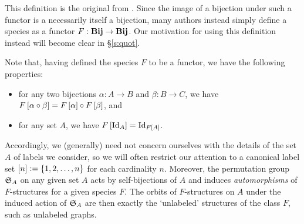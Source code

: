 \documentclass[sectionflow,singlespace,twoside,boldmathhdr,draft]{brandiss} %
\numberwithin{section}{chapter}
\numberwithin{figure}{chapter}
\begin{document}
This definition is the original from \cite{joy:species}.
Since the image of a bijection under such a functor is a necessarily itself a bijection, many authors instead simply define a species as a functor $F: \mathbf{Bij} \to \mathbf{Bij}$.
Our motivation for using this definition instead will become clear in \S \ref{s:quot}.

Note that, having defined the species $F$ to be a functor, we have the following properties:
\begin{itemize}
\item for any two bijections $\alpha: A \to B$ and $\beta: B \to C$, we have $F \left[ {\alpha \circ \beta} \right] = F \left[ {\alpha} \right] \circ F \left[ {\beta} \right]$, and
\item for any set $A$, we have $F \left[ {\operatorname{Id}_{A}} \right] = \operatorname{Id}_{F \left[ {A} \right]}$.
\end{itemize}
Accordingly, we (generally) need not concern ourselves with the details of the set $A$ of labels we consider, so we will often restrict our attention to a canonical label set $\left[ {n} \right] := \left\{ {1, 2, \dots, n} \right\}$ for each cardinality $n$.
Moreover, the permutation group $ \mathfrak{S}_{A} $ on any given set $A$ acts by self-bijections of $A$ and induces \emph{automorphisms} of $F$-structures for a given species $F$.
The orbits of $F$-structures on $A$ under the induced action of $ \mathfrak{S}_{A} $ are then exactly the `unlabeled' structures of the class $F$, such as unlabeled graphs.
\end{document}
